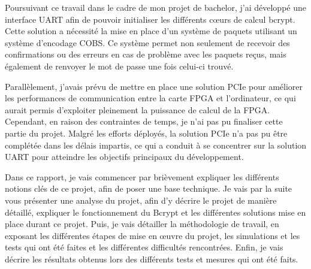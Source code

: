 Poursuivant ce travail dans le cadre de mon projet de bachelor, j'ai développé une interface UART afin de pouvoir initialiser les différents cœurs de calcul bcrypt.
Cette solution a nécessité la mise en place d'un système de paquets utilisant un système d'encodage COBS. 
Ce système permet non seulement de recevoir des confirmations ou des erreurs en cas de problème avec les paquets reçus, mais également de renvoyer le mot de passe une fois celui-ci trouvé.

Parallèlement, j'avais prévu de mettre en place une solution PCIe pour améliorer les performances de communication entre la carte FPGA et l'ordinateur, ce qui aurait permis d'exploiter pleinement la puissance de calcul de la FPGA. 
Cependant, en raison des contraintes de temps, je n'ai pas pu finaliser cette partie du projet. 
Malgré les efforts déployés, la solution PCIe n'a pas pu être complétée dans les délais impartis, ce qui a conduit à se concentrer sur la solution UART pour atteindre les objectifs principaux du développement.


Dans ce rapport, je vais commencer par brièvement expliquer les différents notions clés de ce projet, afin de poser une base technique. 
Je vais par la suite vous présenter une analyse du projet, afin d'y décrire le projet de manière détaillé, expliquer le fonctionnement du Bcrypt et les différentes solutions mise en place durant ce projet. 
Puis, je vais détailler la méthodologie de travail, en exposant les différentes étapes de mise en œuvre du projet, les simulations et les tests qui ont été faites et les différentes difficultés rencontrées. 
Enfin, je vais décrire les résultats obtenus lors des différents tests et mesures qui ont été faits.